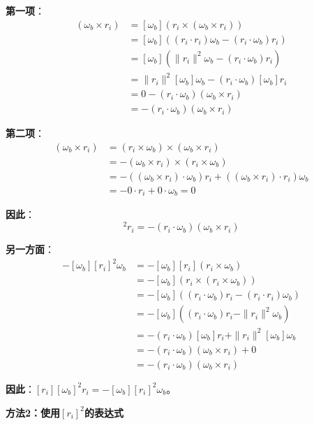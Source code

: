 \documentclass[12pt,a4paper]{article}
\begin{document}
\textbf{第一项}：
\begin{align}
[\omega_b][r_i](\omega_b \times r_i) &= [\omega_b](r_i \times (\omega_b \times r_i)) \\
&= [\omega_b]((r_i \cdot r_i) \omega_b - (r_i \cdot \omega_b) r_i) \\
&= [\omega_b](\|r_i\|^2 \omega_b - (r_i \cdot \omega_b) r_i) \\
&= \|r_i\|^2 [\omega_b] \omega_b - (r_i \cdot \omega_b) [\omega_b] r_i \\
&= 0 - (r_i \cdot \omega_b)(\omega_b \times r_i) \\
&= -(r_i \cdot \omega_b)(\omega_b \times r_i)
\end{align}

\textbf{第二项}：
\begin{align}
[r_i \times \omega_b](\omega_b \times r_i) &= (r_i \times \omega_b) \times (\omega_b \times r_i) \\
&= -(\omega_b \times r_i) \times (r_i \times \omega_b) \\
&= -((\omega_b \times r_i) \cdot \omega_b) r_i + ((\omega_b \times r_i) \cdot r_i) \omega_b \\
&= -0 \cdot r_i + 0 \cdot \omega_b = 0
\end{align}

\textbf{因此}：
\begin{equation}
[r_i][\omega_b]^2 r_i = -(r_i \cdot \omega_b)(\omega_b \times r_i)
\end{equation}

\textbf{另一方面}：
\begin{align}
-[\omega_b][r_i]^2 \omega_b &= -[\omega_b][r_i](r_i \times \omega_b) \\
&= -[\omega_b](r_i \times (r_i \times \omega_b)) \\
&= -[\omega_b]((r_i \cdot \omega_b) r_i - (r_i \cdot r_i) \omega_b) \\
&= -[\omega_b]((r_i \cdot \omega_b) r_i - \|r_i\|^2 \omega_b) \\
&= -(r_i \cdot \omega_b)[\omega_b] r_i + \|r_i\|^2 [\omega_b] \omega_b \\
&= -(r_i \cdot \omega_b)(\omega_b \times r_i) + 0 \\
&= -(r_i \cdot \omega_b)(\omega_b \times r_i)
\end{align}

\textbf{因此}：$[r_i][\omega_b]^2 r_i = -[\omega_b][r_i]^2 \omega_b$。

\textbf{方法2：使用$[r_i]^2$的表达式}
\end{document}
